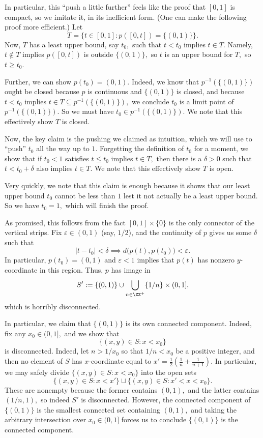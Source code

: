 In particular, this ``push a little further'' feels like the proof that $[0,1]$ is compact, so we imitate it, in its inefficient form. (One can make the following proof more efficient.) Let
\[T=\big\{t\in[0,1]:p([0,t])=\{(0,1)\}\big\}.\]
Now, $T$ has a least upper bound, say $t_0,$ such that $t<t_0$ implies $t\in T.$ Namely, $t\notin T$ implies $p([0,t])$ is outside $\{(0,1)\},$ so $t$ is an upper bound for $T,$ so $t\ge t_0.$

Further, we can show $p(t_0)=(0,1).$ Indeed, we know that $p^{-1}(\{(0,1)\})$ ought be closed because $p$ is continuous and $\{(0,1)\}$ is closed, and because $t<t_0$ implies $t\in T\subseteq p^{-1}(\{(0,1)\}),$ we conclude $t_0$ is a limit point of $p^{-1}(\{(0,1)\}).$ So we must have $t_0\in p^{-1}(\{(0,1)\}).$ We note that this effectively show $T$ is closed.

Now, the key claim is the pushing we claimed as intuition, which we will use to ``push'' $t_0$ all the way up to $1.$ Forgetting the definition of $t_0$ for a moment, we show that if $t_0<1$ satisfies $t\le t_0$ implies $t\in T,$ then there is a $\delta>0$ such that $t<t_0+\delta$ also implies $t\in T.$ We note that this effectively show $T$ is open.

Very quickly, we note that this claim is enough because it shows that our least upper bound $t_0$ cannot be less than $1$ lest it not actually be a least upper bound. So we have $t_0=1,$ which will finish the proof.

As promised, this follows from the fact $[0,1]\times\{0\}$ is the only connector of the vertical strips. Fix $\varepsilon\in(0,1)$ (say, $1/2$), and the continuity of $p$ gives us some $\delta$ such that
\[|t-t_0|<\delta\implies d\big(p(t),p(t_0)\big)<\varepsilon.\]
In particular, $p(t_0)=(0,1)$ and $\varepsilon<1$ implies that $p(t)$ has nonzero $y$-coordinate in this region. Thus, $p$ has image in
\[S':=\{(0,1)\}\cup\bigcup_{n\in\ZZ^+}\{1/n\}\times(0,1],\]
which is horribly disconnected.

In particular, we claim that $\{(0,1)\}$ is its own connected component. Indeed, fix any $x_0\in(0,1],$ and we show that
\[\{(x,y)\in S:x<x_0\}\]
is disconnected. Indeed, let $n>1/x_0$ so that $1/n<x_0$ be a positive integer, and then no element of $S$ has $x$-coordinate equal to $x'=\frac12\left(\frac1n+\frac1{n+1}\right).$ In particular, we may safely divide $\{(x,y)\in S:x<x_0\}$ into the open sets
\[\{(x,y)\in S:x<x'\}\sqcup\{(x,y)\in S:x'<x<x_0\}.\]
These are nonempty because the former contains $(0,1),$ and the latter contains $(1/n,1),$ so indeed $S'$ is disconnected. However, the connected component of $\{(0,1)\}$ is the smallest connected set containing $(0,1),$ and taking the arbitrary intersection over $x_0\in(0,1]$ forces us to conclude $\{(0,1)\}$ is the connected component.

